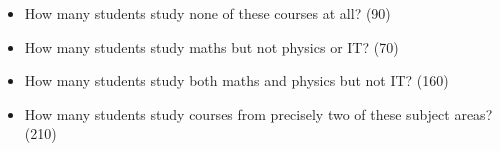 \documentclass[12pt]{report}
\begin{document}
	
	
	\begin{itemize}
		\item How many students study none of these courses at all? (90)
		
		\item How many students study maths but not physics or IT? (70)
		
		\item How many students study both maths and physics but not IT? (160)
		
		\item How many students study courses from precisely two of these subject
		areas? (210)
	\end{itemize}
	
	
\end{document}
